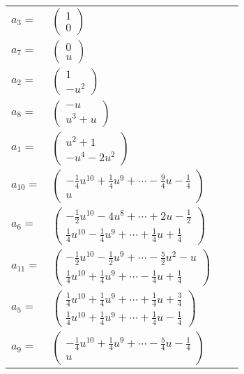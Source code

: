 \documentclass[1p]{elsarticle_modified}
\theoremstyle{definition}
\begin{document}
\begin{tabular}{m{7pt} m{180pt} m{7pt} m{180pt} }
\flushright $a_{3}=$&$\begin{pmatrix}1\\0\end{pmatrix}$ \\
\flushright $a_{7}=$&$\begin{pmatrix}0\\u\end{pmatrix}$ \\
\flushright $a_{2}=$&$\begin{pmatrix}1\\- u^2\end{pmatrix}$ \\
\flushright $a_{8}=$&$\begin{pmatrix}- u\\u^3+u\end{pmatrix}$ \\
\flushright $a_{1}=$&$\begin{pmatrix}u^2+1\\- u^4-2 u^2\end{pmatrix}$ \\
\flushright $a_{10}=$&$\begin{pmatrix}-\frac{1}{4} u^{10}+\frac{1}{4} u^9+\cdots-\frac{9}{4} u-\frac{1}{4}\\u\end{pmatrix}$ \\
\flushright $a_{6}=$&$\begin{pmatrix}-\frac{1}{2} u^{10}-4 u^8+\cdots+2 u-\frac{1}{2}\\\frac{1}{4} u^{10}-\frac{1}{4} u^9+\cdots+\frac{1}{4} u+\frac{1}{4}\end{pmatrix}$ \\
\flushright $a_{11}=$&$\begin{pmatrix}-\frac{1}{2} u^{10}-\frac{1}{2} u^9+\cdots-\frac{5}{2} u^2- u\\\frac{1}{4} u^{10}+\frac{1}{4} u^9+\cdots-\frac{1}{4} u+\frac{1}{4}\end{pmatrix}$ \\
\flushright $a_{5}=$&$\begin{pmatrix}\frac{1}{4} u^{10}+\frac{1}{4} u^9+\cdots+\frac{1}{4} u+\frac{3}{4}\\\frac{1}{4} u^{10}+\frac{1}{4} u^9+\cdots+\frac{1}{4} u-\frac{1}{4}\end{pmatrix}$ \\
\flushright $a_{9}=$&$\begin{pmatrix}-\frac{1}{4} u^{10}+\frac{1}{4} u^9+\cdots-\frac{5}{4} u-\frac{1}{4}\\u\end{pmatrix}$ \\

\end{tabular}
\end{document}
